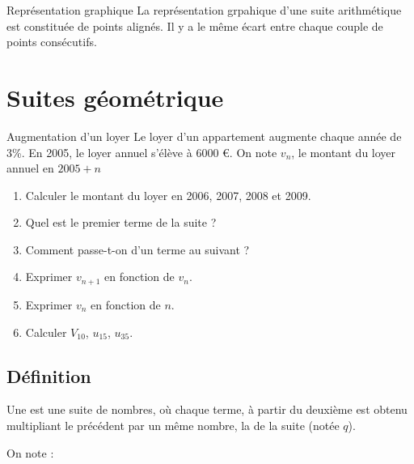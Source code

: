 \documentclass[12pt,a4paper]{article}
\begin{document}
\begin{mybilan}{Représentation graphique}
	La représentation grpahique d'une suite arithmétique est constituée de points alignés. Il y a le même écart entre chaque couple de points consécutifs.
\end{mybilan}
\section{Suites géométrique}

\begin{myact}{Augmentation d'un loyer}
	Le loyer d'un appartement augmente chaque année de 3\%. En 2005, le loyer annuel s'élève à 6000 €.
	On note $v_n$, le montant du loyer annuel en $2005 + n$
	
	\begin{enumerate}
		\item Calculer le montant du loyer en 2006, 2007, 2008 et 2009.
		\item Quel est le premier terme de la suite ?
		\item Comment passe-t-on d'un terme au suivant ?
		\item Exprimer $v_{n+1}$ en fonction de $v_n$.
		\item Exprimer $v_n$ en fonction de $n$.
		\item Calculer $V_{10}$, $u_{15}$, $u_{35}$.
	\end{enumerate}
	
\end{myact}


\subsection{Définition}

\begin{mybilan}

		
	Une  est une suite de nombres, où chaque terme, à partir du deuxième est obtenu multipliant le précédent par un même nombre, la  de la suite (notée $q$).	
	
	On note :
		


\end{mybilan}
\end{document}
